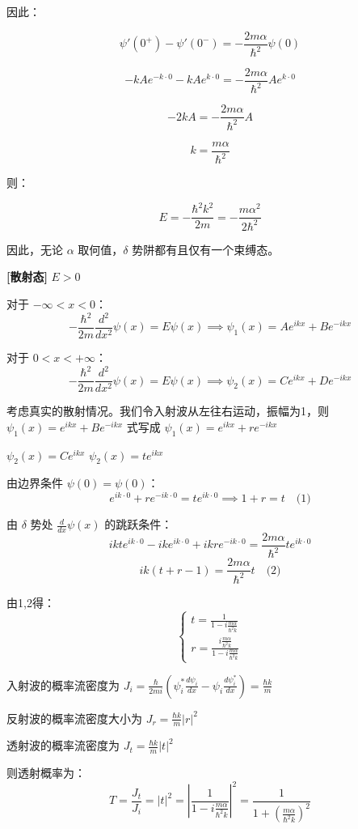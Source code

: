 \documentclass[lang=cn,10pt]{elegantbook}
\begin{document}
因此：

\[
\psi'(0^+) - \psi'(0^-) = -\frac{2m\alpha}{\hbar^2} \psi(0)
\]

\[
-kAe^{-k\cdot0} - kAe^{k\cdot0} = -\frac{2m\alpha}{\hbar^2} A e^{k\cdot0}
\]

\[
-2kA = -\frac{2m\alpha}{\hbar^2} A
\]

\[
k = \frac{m\alpha}{\hbar^2}
\]

则：

\[
E = -\frac{\hbar^2 k^2}{2m} = -\frac{m\alpha^2}{2\hbar^2}
\]

因此，无论 $\alpha$ 取何值，$\delta$ 势阱都有且仅有一个束缚态。

\textbf{[散射态]} $E > 0$

对于 $-\infty < x < 0$：
\[
-\frac{\hbar^2}{2m} \frac{d^2}{dx^2} \psi(x) = E \psi(x) \implies \psi_1(x) = A e^{ikx} + B e^{-ikx}
\]

对于 $0 < x < +\infty$：
\[
-\frac{\hbar^2}{2m} \frac{d^2}{dx^2} \psi(x) = E \psi(x) \implies \psi_2(x) = C e^{ikx} + D e^{-ikx}
\]

考虑真实的散射情况。我们令入射波从左往右运动，振幅为1，则 $\psi_1(x) = e^{ikx} + B e^{-ikx}$ 式写成 $\psi_1(x) = e^{ikx} + r e^{-ikx}$

$\psi_2(x) = C e^{ikx}$ $\psi_2(x) = t e^{ikx}$

由边界条件 $\psi(0) = \psi(0)$：
\[
e^{ik\cdot0} + r e^{-ik\cdot0} = t e^{ik\cdot0} \implies 1 + r = t \quad \text{(1)}
\]

由 $\delta$ 势处 $\frac{d}{dx} \psi(x)$ 的跳跃条件：
\[
ikte^{ik\cdot0} - ik e^{ik\cdot0} + ikr e^{-ik\cdot0} = \frac{2m\alpha}{\hbar^2} t e^{ik\cdot0}
\]
\[
ik(t + r - 1) = \frac{2m\alpha}{\hbar^2} t \quad \text{(2)}
\]

由1,2得：
\[
\left\{
\begin{array}{l}
	t = \frac{1}{1 - i\frac{m\alpha}{\hbar^2 k}} \\
	r = \frac{i\frac{m\alpha}{\hbar^2 k}}{1 - i\frac{m\alpha}{\hbar^2 k}}
\end{array}
\right.
\]

入射波的概率流密度为 $J_i = \frac{\hbar}{2mi} (\psi_i^* \frac{d\psi_i}{dx} - \psi_i \frac{d\psi_i^*}{dx}) = \frac{\hbar k}{m}$

反射波的概率流密度大小为 $J_r = \frac{\hbar k}{m} |r|^2$

透射波的概率流密度为 $J_t = \frac{\hbar k}{m} |t|^2$

则透射概率为：
\[
T = \frac{J_t}{J_i} = |t|^2 = \left| \frac{1}{1 - i\frac{m\alpha}{\hbar^2 k}} \right|^2 = \frac{1}{1 + \left(\frac{m\alpha}{\hbar^2 k}\right)^2}
\]
\end{document}
